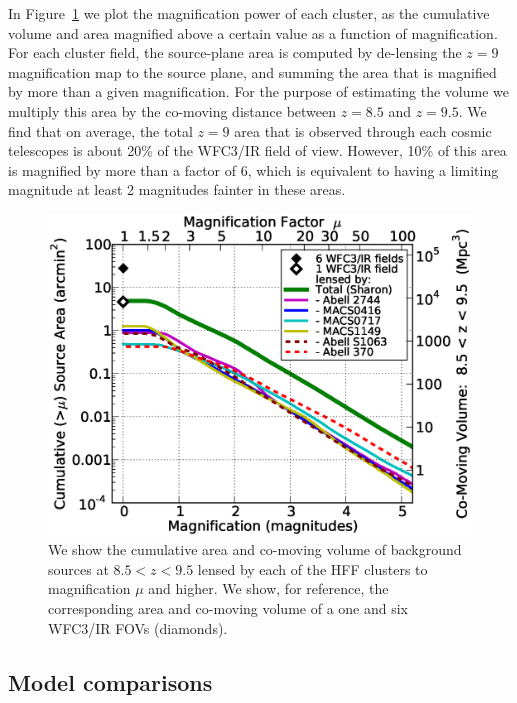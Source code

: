 In Figure~\ref{chap2:fig:volumes} we plot the magnification power of each cluster, as the cumulative volume and area magnified above a certain value as a function of magnification. For each cluster field, the source-plane area is computed by de-lensing the $z=9$ magnification map to the source plane, and summing the area that is magnified by more than a given magnification. For the purpose of estimating the volume we multiply this area by the co-moving distance between $z=8.5$ and $z=9.5$. We find that on average, the total $z=9$ area that is observed through each cosmic telescopes is about 20\% of the WFC3/IR field of view. However, 10\% of this area is magnified by more than a factor of 6, which is equivalent to having a limiting magnitude at least 2 magnitudes fainter in these areas.

\begin{figure}[t]
\includegraphics[width=\textwidth]{Chap2/c2f9.eps}
\caption[Cumulative area and co-moving volume of $z\sim$9 background sources lensed by each of the HFF clusters]{We show the cumulative area and co-moving volume of background sources at $8.5<z<9.5$ lensed by each of the HFF clusters to magnification $\mu$ and higher. We show, for reference, the corresponding area and co-moving volume of a one and six WFC3/IR FOVs (diamonds).}
\label{chap2:fig:volumes}
\end{figure}

\subsection{Model comparisons}

